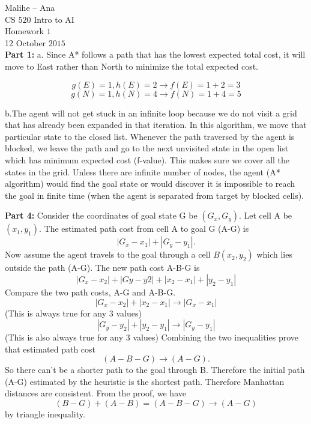 \documentclass[12pt]{amsart}
\begin{document}
\noindent Malihe -- Ana \\
CS $520$ Intro to AI \\
Homework $1$\\
12 October $2015$\\

\noindent \textbf{Part 1:} a. Since A* follows a path that has the lowest expected total cost, it will move to East rather than North to minimize the total expected cost. 

$$g(E)=1, h(E)=2 \rightarrow f(E)=1+2=3 $$
$$ g(N)=1, h(N)=4 \rightarrow f(N)=1+4=5 $$

b.The agent will not get stuck in an infinite loop because we do not visit a grid that has already been expanded in that iteration. In this algorithm, we move that particular state to the closed list. Whenever the path traversed by the agent is blocked, we leave the path and go to the next unvisited state in the open list which has minimum expected cost (f-value). This makes sure we cover all the states in the grid. Unless there are infinite number of nodes, the agent (A* algorithm) would find the goal state or would discover it is impossible to reach the goal in finite time (when the agent is separated from target by blocked cells).

\par
\par

\noindent \textbf{Part  4:} Consider the coordinates of goal state G be $(G_x,G_y)$. Let cell A be $(x_1,y_1)$. The estimated path cost from cell A to goal G (A-G) is $$|G_x-x_1|+|G_y-y_1|.$$ Now assume the agent travels to the goal through a cell $B (x_2,y_2)$ which lies outside the path (A-G). The new path cost A-B-G is $$|G_x- x_2|+|Gy-y2|+|x_2-x_1|+|y_2-y_1|$$
Compare the two path costs, A-G and A-B-G.
\\
$$|G_x-x_2|+|x_2-x_1| \rightarrow  |G_x-x_1|$$(This is always true for any 3 values) $$ |G_y-y_2|+|y_2-y_1|   \rightarrow |G_y-y_1|$$(This is also always true for any 3 values)
Combining the two inequalities prove that estimated path cost $$(A-B-G) \rightarrow (A-G). $$So there can't be a shorter path to the goal through B. Therefore the initial path (A-G) estimated by the heuristic is the shortest path. Therefore Manhattan distances are consistent.
From the proof, we have $$(B-G)+(A-B)=(A-B-G) \rightarrow (A-G)$$  by triangle inequality.


\par
\par
\end{document}
